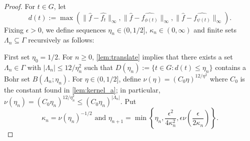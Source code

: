 \begin{proof}
For $t \in G$, let
		\[
			d(t) := \max \left( \| \widehat{f} - \widehat{f_{t}} \|_\infty, \| \widehat{f} - \widehat{f_{\phi(t)}} \|_\infty, \| \widehat{f} - \widehat{f_{\psi(t)}} \|_\infty  \right).
		\]
Fixing $\epsilon > 0$, we define sequences $\eta_n \in (0, 1/2]$, $\kappa_n \in (0, \infty)$ and finite sets $\Lambda_n \subseteq \Gamma$ recursively as follows: 

First set $\eta_0 = 1/2$. For $n \geq 0$, \cref{lem:translate} implies that there exists a set $\Lambda_n \in \Gamma$ with $|\Lambda_n| \leq 12/\eta_n^2$ such that $D(\eta_n) := \{t \in G: d(t) \leq \eta_n\}$ contains a Bohr set $B(\Lambda_n; \eta_n)$.  
For $\eta \in (0, 1/2]$, define $\nu(\eta) = (C_0 \eta)^{12/\eta^2}$ where $C_0$ is the constant found in \cref{lem:kernel_a}; in particular, $\nu(\eta_n) = (C_0 \eta_n)^{12/\eta_n^2} \leq (C_0 \eta_n)^{|\Lambda_n|}$. Put
\[
         \kappa_n = \nu(\eta_n)^{-1/2} \text{ and } \eta_{n+1} = \min \left \{\eta_n, \frac{\epsilon^2}{4 \kappa_n^2}, \epsilon \nu \left( \frac{\epsilon}{2 \kappa_n} \right) \right\}.
\]


\end{proof}
